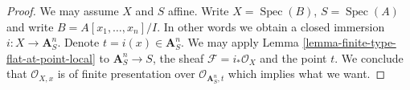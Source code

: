 \documentclass[10pt,a4paper]{amsart}
\theoremstyle{plain}
\theoremstyle{definition}
\theoremstyle{remark}
\numberwithin{equation}{subsection}
\def\Spec{\mathop{\mathrm{Spec}}}
\begin{document}
\begin{proof}
We may assume $X$ and $S$ affine. Write $X = \Spec(B)$,
$S = \Spec(A)$ and write $B = A[x_1, \ldots, x_n]/I$.
In other words we obtain a closed immersion $i : X \to \mathbf{A}^n_S$.
Denote $t = i(x) \in \mathbf{A}^n_S$. We may apply
Lemma \ref{lemma-finite-type-flat-at-point-local}
to $\mathbf{A}^n_S \to S$, the sheaf $\mathcal{F} = i_*\mathcal{O}_X$
and the point $t$. We conclude that $\mathcal{O}_{X, x}$ is
of finite presentation over $\mathcal{O}_{\mathbf{A}^n_S, t}$
which implies what we want.
\end{proof}
\end{document}
